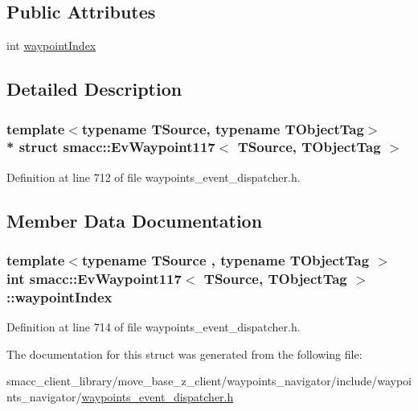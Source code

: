 \subsection*{Public Attributes}
\begin{DoxyCompactItemize}
\item 
int \hyperlink{structsmacc_1_1EvWaypoint117_ada15fdfe8beb3bc0e5e0d3271a4a7e35}{waypoint\+Index}
\end{DoxyCompactItemize}


\subsection{Detailed Description}
\subsubsection*{template$<$typename T\+Source, typename T\+Object\+Tag$>$\\*
struct smacc\+::\+Ev\+Waypoint117$<$ T\+Source, T\+Object\+Tag $>$}



Definition at line 712 of file waypoints\+\_\+event\+\_\+dispatcher.\+h.



\subsection{Member Data Documentation}
\subsubsection[{\texorpdfstring{waypoint\+Index}{waypointIndex}}]{\setlength{\rightskip}{0pt plus 5cm}template$<$typename T\+Source , typename T\+Object\+Tag $>$ int {\bf smacc\+::\+Ev\+Waypoint117}$<$ T\+Source, T\+Object\+Tag $>$\+::waypoint\+Index}\hypertarget{structsmacc_1_1EvWaypoint117_ada15fdfe8beb3bc0e5e0d3271a4a7e35}{}\label{structsmacc_1_1EvWaypoint117_ada15fdfe8beb3bc0e5e0d3271a4a7e35}


Definition at line 714 of file waypoints\+\_\+event\+\_\+dispatcher.\+h.



The documentation for this struct was generated from the following file\+:\begin{DoxyCompactItemize}
\item 
smacc\+\_\+client\+\_\+library/move\+\_\+base\+\_\+z\+\_\+client/waypoints\+\_\+navigator/include/waypoints\+\_\+navigator/\hyperlink{waypoints__event__dispatcher_8h}{waypoints\+\_\+event\+\_\+dispatcher.\+h}\end{DoxyCompactItemize}
